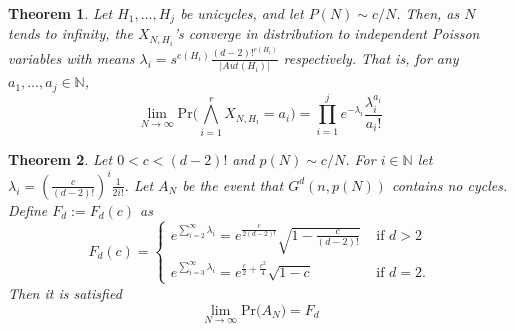 \documentclass[11pt,notitlepage,a4paper]{article}
\newtheorem{theorem}{Theorem}[section]
\theoremstyle{definition}
\newcommand{\N}{\mathbb{N}}
\newcommand{\LN}{\lim\limits_{N\to \infty}}
\begin{document}
\begin{theorem} \label{thm:probunicycliccomponents}
	Let $H_1,\dots, H_j$ be unicycles, and let $P(N)\sim c/N$. 
	Then, as $N$ tends to infinity, the $X_{N,H_i}$'s converge in 
	distribution to independent Poisson variables with means
	$\lambda_i=s^{e(H_i)}\frac{(d-2)!^{e(H_i)}}{|Aut(H_i)|}$
	respectively. That is, for any $a_1,\dots, a_j\in \N$,
	\[
	\LN \mathrm{Pr}\Big(
	\bigwedge_{i=1}^r
	X_{N,H_i}=a_i		
	\Big)= \prod_{i=1}^{j} e^{-\lambda_i}\frac{\lambda_i^{a_i}}{a_i!}
	\]
\end{theorem} 



\begin{theorem} 
	Let $0<c<(d-2)!$ and $p(N)\sim c/N$. For $i\in \N$ let 
	$\lambda_i=\left(\frac{c}{(d-2)!}\right)^i\frac{1}{2i!}$. 
	Let $A_N$ be the event that $G^d(n,p(N))$ contains no cycles. 
	Define $F_d:=F_d(c)$ as
	\[
	F_d(c)=\begin{cases}
	e^{\sum_{i=2}^{\infty} \lambda_i}=
	e^{\frac{c}{2(d-2)!}}\sqrt{1-\frac{c}{(d-2)!}} & \text{ if } d>2\\
	e^{\sum_{i=3}^{\infty} \lambda_i}=
	e^{\frac{c}{2}+\frac{c^2}{4}}\sqrt{1-c} & \text{ if } d=2.
	\end{cases}
	\]
	Then it is satisfied
	\[
	\LN \mathrm{Pr}\big(A_N \big)=F_d
	\]	
\end{theorem} 
\end{document}
